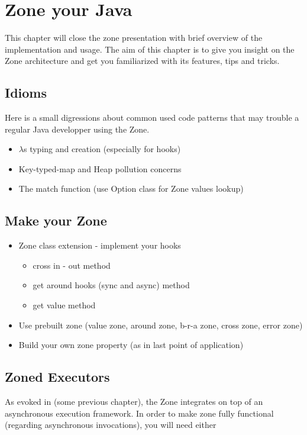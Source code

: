 
\chapter{Zone your Java}

This chapter will close the zone presentation with brief overview of the implementation and usage.
The aim of this chapter is to give you insight on the Zone architecture and get you familiarized with its features, tips and tricks.

\section{Idioms}

Here is a small digressions about common used code patterns that may trouble a regular Java developper using the Zone.

\begin{itemize}
\item $\lambda$s typing and creation (especially for hooks)
\item Key-typed-map and Heap pollution concerns
\item The match function (use Option class for Zone values lookup)
\end{itemize}

\section{Make your Zone}

\begin{itemize}
\item Zone class extension - implement your hooks
  \begin{itemize}
  \item cross in - out method
  \item get around hooks (sync and async) method
  \item get value method
  \end{itemize}
\item Use prebuilt zone (value zone, around zone, b-r-a zone, cross zone, error zone)
\item Build your own zone property (as in last point of application)
\end{itemize}


\section{Zoned Executors}

As evoked in (some previous chapter), the Zone integrates on top of an asynchronous execution framework. In order to make zone fully functional (regarding asynchronous invocations), you will need either


